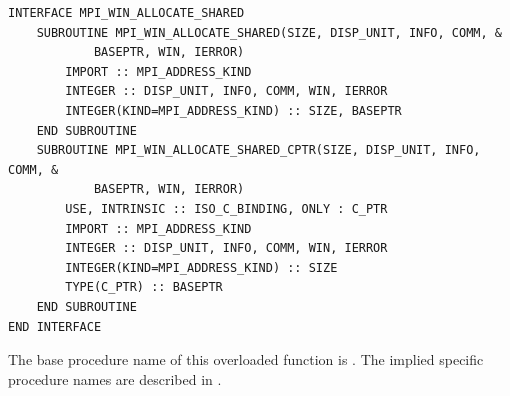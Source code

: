 \begin{verbatim}
INTERFACE MPI_WIN_ALLOCATE_SHARED
    SUBROUTINE MPI_WIN_ALLOCATE_SHARED(SIZE, DISP_UNIT, INFO, COMM, &
            BASEPTR, WIN, IERROR)
        IMPORT :: MPI_ADDRESS_KIND
        INTEGER :: DISP_UNIT, INFO, COMM, WIN, IERROR
        INTEGER(KIND=MPI_ADDRESS_KIND) :: SIZE, BASEPTR
    END SUBROUTINE
    SUBROUTINE MPI_WIN_ALLOCATE_SHARED_CPTR(SIZE, DISP_UNIT, INFO, COMM, &
            BASEPTR, WIN, IERROR)
        USE, INTRINSIC :: ISO_C_BINDING, ONLY : C_PTR
        IMPORT :: MPI_ADDRESS_KIND
        INTEGER :: DISP_UNIT, INFO, COMM, WIN, IERROR
        INTEGER(KIND=MPI_ADDRESS_KIND) :: SIZE
        TYPE(C_PTR) :: BASEPTR
    END SUBROUTINE
END INTERFACE
\end{verbatim}
 
The base procedure name of this overloaded function is\flushline %
. The implied specific procedure names
are described in .

